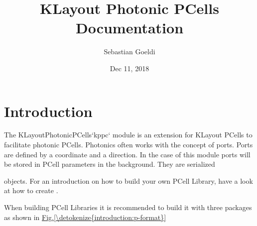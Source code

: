 \documentclass[a4paper,10pt,english]{sphinxmanual}
\title{KLayout Photonic PCells Documentation}
\date{Dec 11, 2018}
\author{Sebastian Goeldi}
\begin{document}
\pagestyle{empty}
\maketitle
\pagestyle{plain}
\sphinxtableofcontents
\pagestyle{normal}
\label{\detokenize{index::doc}}



\chapter{Introduction}
\label{\detokenize{introduction:introduction}}\label{\detokenize{introduction::doc}}
The KLayoutPhotonicPCells{}`kppc{}` module is an extension for KLayout PCells to facilitate photonic PCells.
Photonics often works with the concept of ports.
Ports are defined by a coordinate and a direction. In the case of this module ports will be stored in PCell parameters in the background.
They are serialized %
\begin{footnote}[1]\sphinxAtStartFootnote
{}
%
\end{footnote} objects. For an introduction on how to build your own PCell Library, have a look at
how to create {\hyperref[\detokenize{example_library::doc}]{}}.

When building PCell Libraries it is recommended to build it with three packages as shown in \hyperref[\detokenize{introduction:p-format}]{Fig.\@ \ref{\detokenize{introduction:p-format}}}
\end{document}
